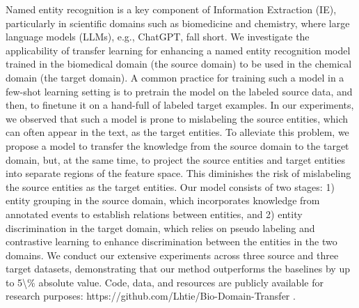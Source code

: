 Named entity recognition is a key component of Information Extraction (IE), particularly in scientific domains such as biomedicine and chemistry, where large language models (LLMs), e.g., ChatGPT, fall short. We investigate the applicability of transfer learning for enhancing a named entity recognition model trained in the biomedical domain (the source domain) to be used in the chemical domain (the target domain). A common practice for training such a model in a few-shot learning setting is to pretrain the model on the labeled source data, and then, to finetune it on a hand-full of labeled target examples. In our experiments, we observed that such a model is prone to mislabeling the source entities, which can often appear in the text, as the target entities. To alleviate this problem, we propose a model to transfer the knowledge from the source domain to the target domain, but, at the same time, to project the source entities and target entities into separate regions of the feature space. This diminishes the risk of mislabeling the source entities as the target entities. Our model consists of two stages: 1) entity grouping in the source domain, which incorporates knowledge from annotated events to establish relations between entities, and 2) entity discrimination in the target domain, which relies on pseudo labeling and contrastive learning to enhance discrimination between the entities in the two domains. We conduct our extensive experiments across three source and three target datasets, demonstrating that our method outperforms the baselines by up to 5\textbackslash{}\% absolute value. Code, data, and resources are publicly available for research purposes: https://github.com/Lhtie/Bio-Domain-Transfer .